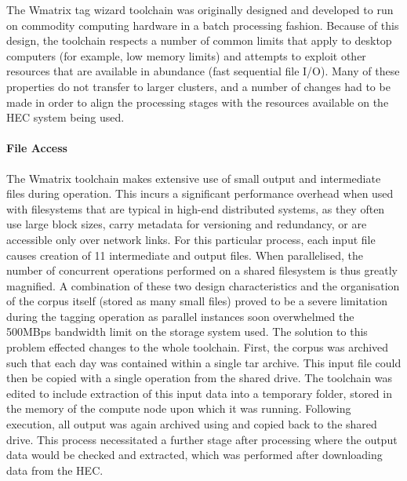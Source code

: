 
The Wmatrix tag wizard toolchain was originally designed and developed to run on commodity computing hardware in a batch processing fashion.  Because of this design, the toolchain respects a number of common limits that apply to desktop computers (for example, low memory limits) and attempts to exploit other resources that are available in abundance (fast sequential file I/O).
Many of these properties do not transfer to larger clusters, and a number of changes had to be made in order to align the processing stages with the resources available on the HEC system being used.


\paragraph{File Access}
The Wmatrix toolchain makes extensive use of small output and intermediate files during operation.  This incurs a significant performance overhead when used with filesystems that are typical in high-end distributed systems, as they often use large block sizes, carry metadata for versioning and redundancy, or are accessible only over network links.
For this particular process, each input file causes creation of 11 intermediate and output files.  When parallelised, the number of concurrent operations performed on a shared filesystem is thus greatly magnified.
A combination of these two design characteristics and the organisation of the corpus itself (stored as many small files) proved to be a severe limitation during the tagging operation as parallel instances soon overwhelmed the 500MBps bandwidth limit on the storage system used.
The solution to this problem effected changes to the whole toolchain.  First, the corpus was archived such that each day was contained within a single tar archive.  This input file could then be copied with a single operation from the shared drive.
The toolchain was edited to include extraction of this input data into a temporary folder, stored in the memory of the compute node upon which it was running.
Following execution, all output was again archived using  and copied back to the shared drive.  This process necessitated a further stage after processing where the output data would be checked and extracted, which was performed after downloading data from the HEC.


